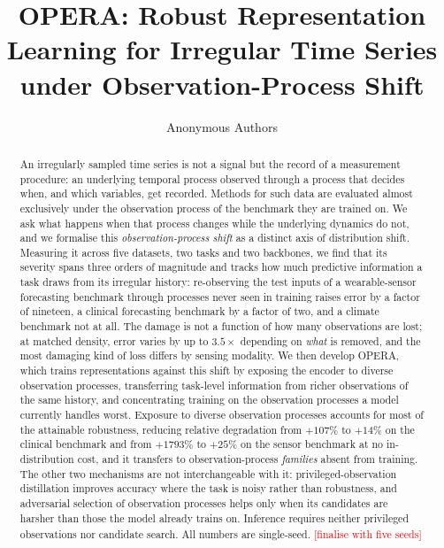 \documentclass[sigconf,nonacm]{acmart}
\newcommand{\todo}[1]{\textcolor{red}{[#1]}}
\newcommand{\prelim}{\textsuperscript{\dag}}
\begin{document}
\title{OPERA: Robust Representation Learning for Irregular Time Series\\ under Observation-Process Shift}

\author{Anonymous Authors}

\begin{abstract}
An irregularly sampled time series is not a signal but the record of a measurement procedure: an underlying
temporal process observed through a process that decides when, and which variables, get recorded. Methods for
such data are evaluated almost exclusively under the observation process of the benchmark they are trained on.
We ask what happens when that process changes while the underlying dynamics do not, and we formalise this
\emph{observation-process shift} as a distinct axis of distribution shift. Measuring it across five datasets,
two tasks and two backbones, we find that its severity spans three orders of magnitude and tracks how much
predictive information a task draws from its irregular history: re-observing the test inputs of a wearable-sensor
forecasting benchmark through processes never seen in training raises error by a factor of nineteen, a clinical
forecasting benchmark by a factor of two, and a climate benchmark not at all. The damage is not a function of how
many observations are lost; at matched density, error varies by up to $3.5\times$ depending on \emph{what} is
removed, and the most damaging kind of loss differs by sensing modality. We then develop OPERA, which trains
representations against this shift by exposing the encoder to diverse observation processes, transferring
task-level information from richer observations of the same history, and concentrating training on the
observation processes a model currently handles worst. Exposure to diverse observation processes accounts for
most of the attainable robustness, reducing relative degradation from $+107\%$ to $+14\%$ on the clinical
benchmark and from $+1793\%$ to $+25\%$ on the sensor benchmark at no in-distribution cost, and it transfers to
observation-process \emph{families} absent from training. The other two mechanisms are not interchangeable with
it: privileged-observation distillation improves accuracy where the task is noisy rather than robustness, and
adversarial selection of observation processes helps only when its candidates are harsher than those the model
already trains on. Inference requires neither privileged observations nor candidate search.
\prelim All numbers are single-seed. \todo{finalise with five seeds}
\end{abstract}
\end{document}
